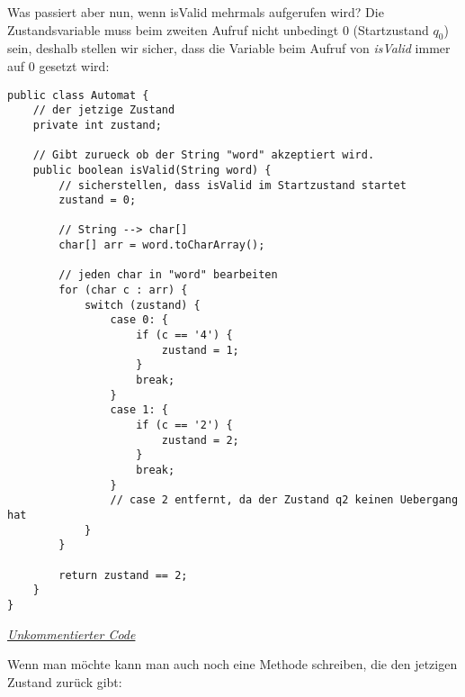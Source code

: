 \begin{flushleft}
    Was passiert aber nun, wenn isValid mehrmals aufgerufen wird?
    Die Zustandsvariable muss beim zweiten Aufruf nicht unbedingt 0 (Startzustand $q_0$) sein,
    deshalb stellen wir sicher, dass die Variable beim Aufruf von \textit{isValid} immer auf 0 gesetzt wird:
\end{flushleft}

\begin{center}
\begin{lstlisting}
public class Automat {
    // der jetzige Zustand
    private int zustand;

    // Gibt zurueck ob der String "word" akzeptiert wird.
    public boolean isValid(String word) {
        // sicherstellen, dass isValid im Startzustand startet
        zustand = 0;

        // String --> char[]
        char[] arr = word.toCharArray();

        // jeden char in "word" bearbeiten
        for (char c : arr) {
            switch (zustand) {
                case 0: {
                    if (c == '4') {
                        zustand = 1;
                    }
                    break;
                }
                case 1: {
                    if (c == '2') {
                        zustand = 2;
                    }
                    break;
                }
                // case 2 entfernt, da der Zustand q2 keinen Uebergang hat
            }
        }

        return zustand == 2;
    }
}
\end{lstlisting}
\href{https://raw.githubusercontent.com/tim-tm/informatik-notes/main/code/Automat.java}{\textit{Unkommentierter Code}} \\
\end{center}

\begin{flushleft}
    Wenn man möchte kann man auch noch eine Methode schreiben, die den jetzigen Zustand zurück gibt:
\end{flushleft}


